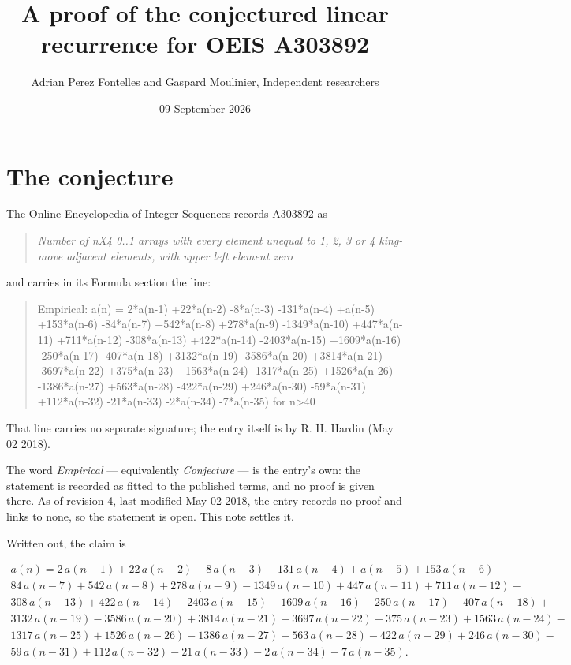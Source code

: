 \documentclass[11pt]{article}
\title{A proof of the conjectured linear recurrence for OEIS A303892}
\author{Adrian Perez Fontelles and Gaspard Moulinier, Independent researchers}
\date{09 September 2026}
\theoremstyle{definition}
\begin{document}
\maketitle
\section{The conjecture}

The Online Encyclopedia of Integer Sequences records \href{https://oeis.org/A303892}{A303892} as

\begin{quote}\itshape Number of nX4 0..1 arrays with every element unequal to 1, 2, 3 or 4 king-move adjacent elements, with upper left element zero\end{quote}

and carries in its Formula section the line:

\begin{quote}\ttfamily Empirical: a(n) = 2*a(n-1) +22*a(n-2) -8*a(n-3) -131*a(n-4) +a(n-5) +153*a(n-6) -84*a(n-7) +542*a(n-8) +278*a(n-9) -1349*a(n-10) +447*a(n-11) +711*a(n-12) -308*a(n-13) +422*a(n-14) -2403*a(n-15) +1609*a(n-16) -250*a(n-17) -407*a(n-18) +3132*a(n-19) -3586*a(n-20) +3814*a(n-21) -3697*a(n-22) +375*a(n-23) +1563*a(n-24) -1317*a(n-25) +1526*a(n-26) -1386*a(n-27) +563*a(n-28) -422*a(n-29) +246*a(n-30) -59*a(n-31) +112*a(n-32) -21*a(n-33) -2*a(n-34) -7*a(n-35) for n>40\end{quote}

That line carries no separate signature; the entry itself is by R. H. Hardin (May 02 2018).

The word {\itshape Empirical} --- equivalently {\itshape Conjecture} --- is the entry's own: the statement is recorded as fitted to the published terms, and no proof is given there. As of revision 4, last modified May 02 2018, the entry records no proof and links to none, so the statement is open. This note settles it.

Written out, the claim is

\begin{multline*} a(n) = 2\,a(n-1) + 22\,a(n-2) - 8\,a(n-3) - 131\,a(n-4) + a(n-5) + 153\,a(n-6) - \\ 84\,a(n-7) + 542\,a(n-8) + 278\,a(n-9) - 1349\,a(n-10) + 447\,a(n-11) + 711\,a(n-12) - \\ 308\,a(n-13) + 422\,a(n-14) - 2403\,a(n-15) + 1609\,a(n-16) - 250\,a(n-17) - 407\,a(n-18) + \\ 3132\,a(n-19) - 3586\,a(n-20) + 3814\,a(n-21) - 3697\,a(n-22) + 375\,a(n-23) + 1563\,a(n-24) - \\ 1317\,a(n-25) + 1526\,a(n-26) - 1386\,a(n-27) + 563\,a(n-28) - 422\,a(n-29) + 246\,a(n-30) - \\ 59\,a(n-31) + 112\,a(n-32) - 21\,a(n-33) - 2\,a(n-34) - 7\,a(n-35). \end{multline*}
\end{document}
